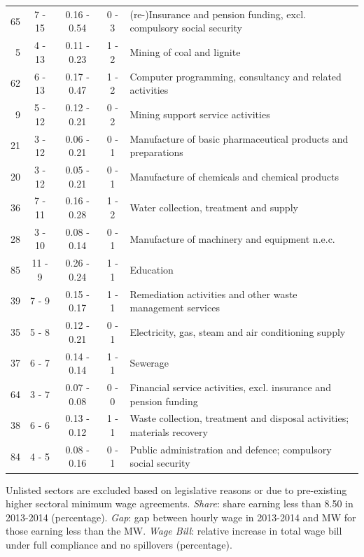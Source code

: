 \begin{table}[htbp]
\begin{threeparttable}
\begin{tabular}{r|c|c|c|l}
65&	7 - 15&	0.16 - 0.54&	0 - 3&	(re-)Insurance and pension funding, excl. compulsory social security\\
5&	4 - 13&	0.11 - 0.23&	1 - 2&	Mining of coal and lignite\\
62&	6 - 13&	0.17 - 0.47&	1 - 2&	Computer programming, consultancy and related activities\\
9&	5 - 12&	0.12 - 0.21&	0 - 2&	Mining support service activities\\
21&	3 - 12&	0.06 - 0.21&	0 - 1&	Manufacture of basic pharmaceutical products and preparations\\
20&	3 - 12&	0.05 - 0.21&	0 - 1&	Manufacture of chemicals and chemical products\\
36&	7 - 11&	0.16 - 0.28&	1 - 2&	Water collection, treatment and supply\\
28&	3 - 10&	0.08 - 0.14&	0 - 1&	Manufacture of machinery and equipment n.e.c.\\
85&	11 - 9&	0.26 - 0.24&	1 - 1&	Education\\
39&	7 - 9&	0.15 - 0.17&	1 - 1&	Remediation activities and other waste management services\\
35&	5 - 8&	0.12 - 0.21&	0 - 1&	Electricity, gas, steam and air conditioning supply\\
37&	6 - 7&	0.14 - 0.14&	1 - 1&	Sewerage\\
64&	3 - 7&	0.07 - 0.08&	0 - 0&	Financial service activities, excl. insurance and pension funding\\
38&	6 - 6&	0.13 - 0.12&	1 - 1&	Waste collection, treatment and disposal activities; materials recovery\\
84&	4 - 5&	0.08 - 0.16&	0 - 1&	Public administration and defence; compulsory social security\\
    \bottomrule
    \end{tabular}
\begin{tablenotes}
\item \footnotesize Unlisted sectors are excluded based on legislative reasons or due to pre-existing higher sectoral minimum wage agreements. \emph{Share}: share earning less than 8.50 in 2013-2014 (percentage). \emph{Gap}: gap between hourly wage in 2013-2014 and MW for those earning less than the MW. \emph{Wage Bill}: relative increase in total wage bill under full compliance and no spillovers (percentage).
\end{tablenotes}
\end{threeparttable}
\end{table}

